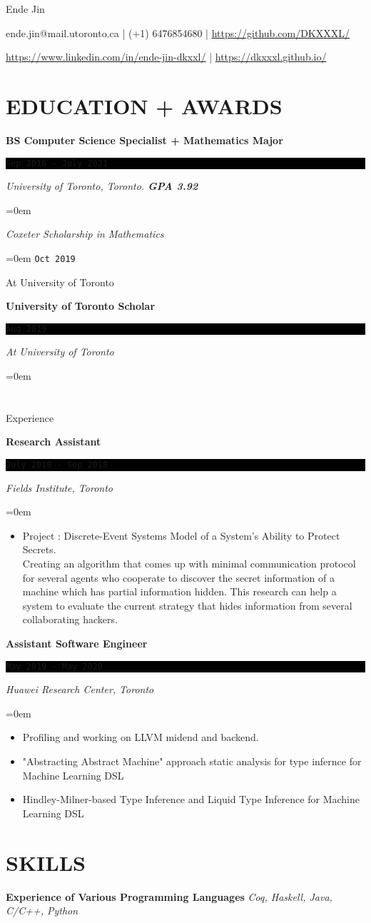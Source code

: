 \documentclass[fontsize=11pt]{article}
\newcommand{\MyName}[1]{ %
    \Huge \usefont{OT1}{phv}{b}{n} \hfill #1
    \par \normalsize \normalfont}
\newcommand{\NewPart}[1]{\section*{\uppercase{#1}}}
\newcommand{\SkillEntry}[2]{       %
    \noindent \textbf{#1} \hfill      %
        \noindent \textit{#2} \par        %
}
\newcommand{\EducationEntry}[4]{
    \noindent \textbf{#1} \hfill      %
    \colorbox{Black}{ 
      \parbox{11em}{
      \centering \color{White}#2}} \par  %
    \noindent \textit{#3} \par        %
    \noindent\hangindent=0em\hangafter=0 \small #4 %
    \normalsize \par}
\newcommand{\WorkEntry}[4]{       %
    \noindent \textbf{#1} \hfill      %
    \colorbox{Black}{%
      \parbox{11em}{%
      \centering\color{White}#2}} \par   %
        \noindent \textit{#3} \par        %
    \noindent\hangindent=0em\hangafter=0 \small #4 %
    \normalsize \par}
\begin{document}
    
\MyName{Ende Jin}
\bigskip
{\small \hfill {\large \faEnvelope} ende.jin@mail.utoronto.ca | {\large \faMobile} (+1) 6476854680 | {\large \faGithubSquare}  \url{https://github.com/DKXXXL/} \par
 \hfill {\large \faLinkedinSquare}  \url{https://www.linkedin.com/in/ende-jin-dkxxl/} | {\large \faWordpress} \url{https://dkxxxl.github.io/}}
\NewPart{Education + Awards}{}
\EducationEntry
{BS Computer Science Specialist + Mathematics Major}
{ \texttt{Sep 2016 - July 2021} }
{University of Toronto, Toronto.    \bf{GPA 3.92}}

\EducationEntry{Coxeter Scholarship in Mathematics}
{\texttt{Oct 2019}}{At University of Toronto}

\EducationEntry{University of Toronto Scholar}
{\texttt{Aug 2019}}{At University of Toronto}

\NewPart{Experience}{}

\WorkEntry
{Research Assistant}
{\texttt{July 2018 - Sep 2018}}
{Fields Institute, Toronto}
{\begin{itemize} \itemsep -1pt
    \item Project : Discrete-Event Systems Model of a System’s Ability to Protect Secrets. 
    \\ Creating an algorithm that comes up with minimal communication protocol for several agents who cooperate to discover the secret information of a machine which has partial information hidden. This research can help a system to evaluate the current strategy that hides information from several collaborating hackers.
    \end{itemize}}
    
\WorkEntry
{Assistant Software Engineer}
{\texttt{May 2019 - May 2020}}
{Huawei Research Center, Toronto}
{\begin{itemize} \itemsep -1pt
    \item Profiling and working on LLVM midend and backend.
    \item "Abstracting Abstract Machine" approach static analysis for type infernce for Machine Learning DSL
    \item Hindley-Milner-based Type Inference and Liquid Type Inference for Machine Learning DSL
	\end{itemize}}
\NewPart{Skills}{}
\SkillEntry{Experience of Various Programming Languages}{Coq, Haskell, Java, C/C++, Python}
\end{document}
